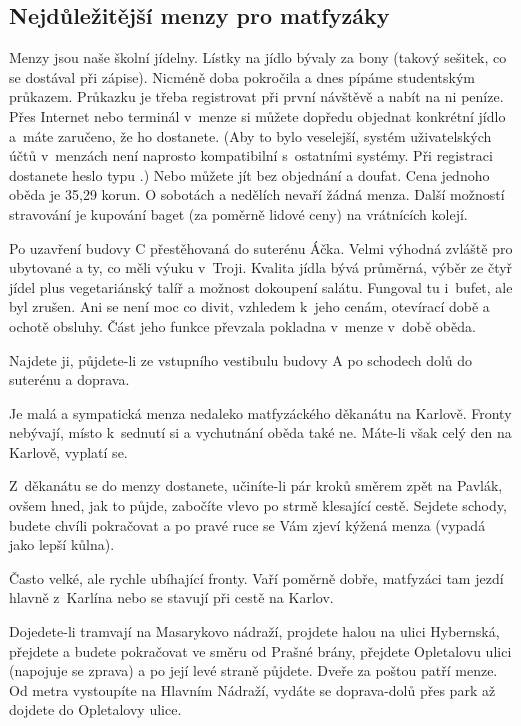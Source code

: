 \subsection{Nejdůležitější menzy pro matfyzáky}

Menzy jsou naše školní jídelny. Lístky na jídlo bývaly za bony
(takový sešitek, co se dostával při zápise). Nicméně doba
pokročila a dnes pípáme studentským průkazem. Průkazku je třeba
registrovat při první návštěvě a nabít na ni peníze. Přes Internet
nebo terminál v~menze si můžete dopředu objednat konkrétní jídlo
a~máte zaručeno, že ho dostanete. (Aby to bylo veselejší, systém uživatelských účtů v~menzách není naprosto kompatibilní s~ostatními systémy. Při registraci dostanete heslo typu .) Nebo můžete jít bez objednání
 a doufat. Cena jednoho oběda je 35,29 korun.
O sobotách a nedělích nevaří žádná menza. Další možností
stravování je kupování baget (za poměrně lidové ceny) na
vrátnících kolejí.

Po uzavření budovy C přestěhovaná do suterénu Áčka.
Velmi výhodná zvláště pro ubytované a ty, co měli výuku v~Troji.
Kvalita jídla bývá průměrná, výběr ze čtyř jídel plus
vegetariánský talíř a možnost dokoupení salátu. Fungoval tu
i~bufet, ale byl zrušen. Ani se není moc co divit, vzhledem k~jeho
cenám, otevírací době a ochotě obsluhy. Část jeho funkce převzala
pokladna v~menze v~době oběda.

Najdete ji, půjdete-li ze vstupního vestibulu budovy A po schodech dolů do suterénu a doprava.

Je malá a sympatická menza nedaleko
matfyzáckého děkanátu na Karlově. Fron\-ty nebývají, místo
k~sednutí si a vychutnání oběda také ne. Máte-li však celý den na
Karlově, vyplatí se.

Z~děkanátu se do menzy dostanete,
učiníte-li pár kroků směrem zpět na Pavlák, ovšem hned, jak to
půjde, zabočíte vlevo po strmě klesající cestě. Sejdete schody,
budete chvíli pokračovat a po pravé ruce se Vám zjeví kýžená menza
(vypadá jako lepší kůlna).

Často velké, ale rychle ubíhající
fronty. Vaří poměrně dobře, matfyzáci tam jezdí hlavně z~Karlína
nebo se stavují při cestě na Karlov.

Dojedete-li tramvají na Masarykovo
nádraží, projdete halou na ulici Hybernská, přejdete a budete
pokračovat ve směru od Prašné brány, přejdete Opletalovu ulici
(napojuje se zprava) a po její levé straně půjdete. Dveře za
poštou patří menze. Od metra vystoupíte na Hlavním Nádraží, vydáte
se doprava-dolů přes park až dojdete do Opletalovy ulice.

